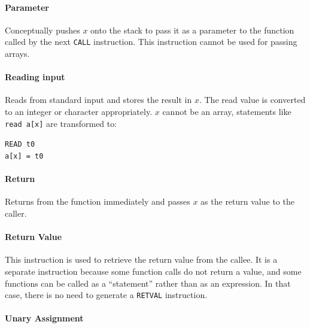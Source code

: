 \documentclass[a4paper]{article}
\begin{document}
\paragraph{Parameter\\}

Conceptually pushes $x$ onto the stack to pass it as a parameter to the
function called by the next \texttt{CALL} instruction. This instruction cannot
be used for passing arrays.

\paragraph{Reading input\\}

Reads from standard input and stores the result in $x$. The read value is
converted to an integer or character appropriately. $x$ cannot be an array,
statements like \texttt{read a[x]} are transformed to:
\begin{center}
\texttt{READ t0}\\
\texttt{a[x] = t0}\\
\end{center}

\paragraph{Return\\}

Returns from the function immediately and passes $x$ as the return value to
the caller.

\paragraph{Return Value\\}

This instruction is used to retrieve the return value from the callee. It is a
separate instruction because some function calls do not return a value, and some
functions can be called as a ``statement'' rather than as an expression. In
that case, there is no need to generate a \texttt{RETVAL} instruction.

\paragraph{Unary Assignment\\}
\end{document}
